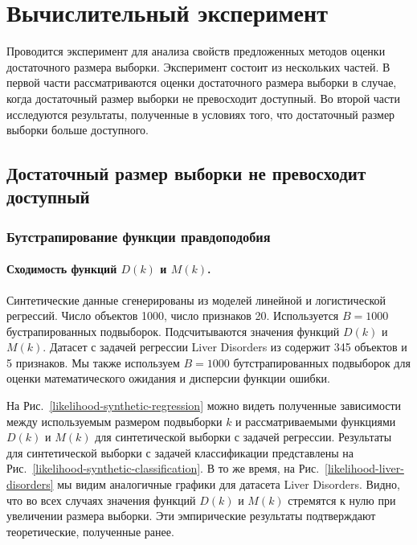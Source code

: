 \section{Вычислительный эксперимент}\label{sec4}

Проводится эксперимент для анализа свойств предложенных методов оценки достаточного размера выборки. Эксперимент состоит из нескольких частей. В первой части рассматриваются оценки достаточного размера выборки в случае, когда достаточный размер выборки не превосходит доступный. Во второй части исследуются результаты, полученные в условиях того, что достаточный размер выборки больше доступного.

\subsection{Достаточный размер выборки не превосходит доступный}

\subsubsection{Бутстрапирование функции правдоподобия}

\paragraph{Сходимость функций $D(k)$ и $M(k)$.}

Синтетические данные сгенерированы из моделей линейной и логистической регрессий. Число объектов 1000, число признаков 20. Используется $B=1000$ бустрапированных подвыборок. Подсчитываются значения функций $D(k)$ и $M(k)$. Датасет с задачей регрессии Liver Disorders из \cite{UCI} содержит 345 объектов и 5 признаков. Мы также используем $B=1000$ бутстрапированных подвыборок для оценки математического ожидания и дисперсии функции ошибки.

На Рис.~\ref{likelihood-synthetic-regression} можно видеть полученные зависимости между используемым размером подвыборки $k$ и рассматриваемыми функциями $D(k)$ и $M(k)$ для синтетической выборки с задачей регрессии. Результаты для синтетической выборки с задачей классификации представлены на Рис.~\ref{likelihood-synthetic-classification}. В то же время, на Рис.~\ref{likelihood-liver-disorders} мы видим аналогичные графики для датасета Liver Disorders. Видно, что во всех случаях значения функций $D(k)$ и $M(k)$ стремятся к нулю при увеличении размера выборки. Эти эмпирические результаты подтверждают теоретические, полученные ранее.

